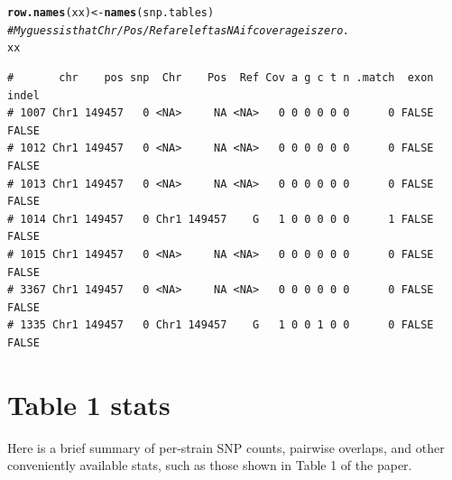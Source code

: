 \documentclass{article}\usepackage[]{graphicx}\usepackage[]{color}
\makeatletter
\newcommand{\hlcom}[1]{\textcolor[rgb]{0.678,0.584,0.686}{\textit{#1}}}%
\newcommand{\hlstd}[1]{\textcolor[rgb]{0.345,0.345,0.345}{#1}}%
\newcommand{\hlkwb}[1]{\textcolor[rgb]{0.69,0.353,0.396}{#1}}%
\newcommand{\hlkwd}[1]{\textcolor[rgb]{0.737,0.353,0.396}{\textbf{#1}}}%
\newenvironment{kframe}{%
 \def\at@end@of@kframe{}%
 \ifinner\ifhmode%
  \def\at@end@of@kframe{\end{minipage}}%
  \begin{minipage}{\columnwidth}%
 \fi\fi%
 \def\FrameCommand##1{\hskip\@totalleftmargin \hskip-\fboxsep
 \colorbox{shadecolor}{##1}\hskip-\fboxsep
     \hskip-\linewidth \hskip-\@totalleftmargin \hskip\columnwidth}%
 \MakeFramed {\advance\hsize-\width
   \@totalleftmargin\z@ \linewidth\hsize
   \@setminipage}}%
 {\par\unskip\endMakeFramed%
 \at@end@of@kframe}
\newenvironment{knitrout}{}{} %
\makeatother
\begin{document}
\begin{knitrout}
\begin{kframe}
\begin{alltt}
\hlkwd{row.names}\hlstd{(xx)}\hlkwb{<-}\hlkwd{names}\hlstd{(snp.tables)}
\hlcom{# My guess is that Chr/Pos/Ref are left as NA if coverage is zero.}
\hlstd{xx}
\end{alltt}
\begin{verbatim}
#       chr    pos snp  Chr    Pos  Ref Cov a g c t n .match  exon indel
# 1007 Chr1 149457   0 <NA>     NA <NA>   0 0 0 0 0 0      0 FALSE FALSE
# 1012 Chr1 149457   0 <NA>     NA <NA>   0 0 0 0 0 0      0 FALSE FALSE
# 1013 Chr1 149457   0 <NA>     NA <NA>   0 0 0 0 0 0      0 FALSE FALSE
# 1014 Chr1 149457   0 Chr1 149457    G   1 0 0 0 0 0      1 FALSE FALSE
# 1015 Chr1 149457   0 <NA>     NA <NA>   0 0 0 0 0 0      0 FALSE FALSE
# 3367 Chr1 149457   0 <NA>     NA <NA>   0 0 0 0 0 0      0 FALSE FALSE
# 1335 Chr1 149457   0 Chr1 149457    G   1 0 0 1 0 0      0 FALSE FALSE
\end{verbatim}
\end{kframe}
\end{knitrout}

\section{Table 1 stats}
\label{sec:table1}

Here is a brief summary of per-strain SNP counts, pairwise overlaps, and other conveniently available 
stats, such as those shown in Table 1 of the paper.
\end{document}
